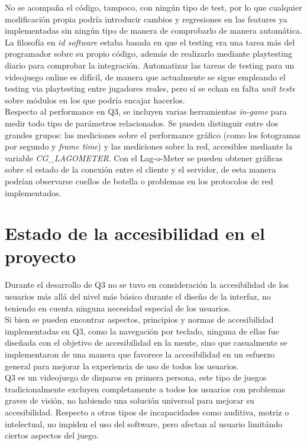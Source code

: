 \documentclass[a4paper,12pt]{report}
\begin{document}
    No se acompaña el código, tampoco, con ningún tipo de test, por lo que cualquier modificación propia podría introducir cambios y regresiones en las features ya implementadas sin ningún tipo de manera de comprobarlo de manera automática. La filosofía en \textit{id software} estaba basada en que el testing era una tarea más del programador sobre su propio código, además de realizarlo mediante playtesting diario para comprobar la integración. Automatizar las tareas de testing para un videojuego online es difícil, de manera que actualmente se sigue empleando el testing via playtesting entre jugadores reales, pero sí se echan en falta \textit{unit tests} sobre módulos en los que podría encajar hacerlos.\\
    
    Respecto al performance en Q3, se incluyen varias herramientas\textit{ in-game }para medir todo tipo de parámetros relacionados. Se pueden distinguir entre dos grandes grupos: las mediciones sobre el performance gráfico (como los fotogramas por segundo y \textit{frame time}) y las mediciones sobre la red, accesibles mediante la variable \textit{CG\_LAGOMETER}. Con el Lag-o-Meter se pueden obtener gráficas sobre el estado de la conexión entre el cliente y el servidor, de esta manera podrían observarse cuellos de botella o problemas en los protocolos de red implementados.
	
	\section{Estado de la accesibilidad en el proyecto}
    Durante el desarrollo de Q3 no se tuvo en consideración la accesibilidad de los usuarios más allá del nivel más básico durante el diseño de la interfaz, no teniendo en cuenta ninguna necesidad especial de los usuarios. \\
    
    Si bien se pueden encontrar aspectos, principios y normas de accesibilidad implementadas en Q3, como la navegación por teclado, ninguna de ellas fue diseñada con el objetivo de accesibilidad en la mente, sino que casualmente se implementaron de una manera que favorece la accesibilidad en un esfuerzo general para mejorar la experiencia de uso de todos los usuarios.\\
    
    Q3 es un videojuego de disparos en primera persona, este tipo de juegos tradicionalmente excluyen completamente a todos los usuarios con problemas graves de visión, no habiendo una solución universal para mejorar su accesibilidad. Respecto a otros tipos de incapacidades como auditiva, motriz o intelectual, no impiden el uso del software, pero afectan al usuario limitándo ciertos aspectos del juego.\\
    
\end{document}
